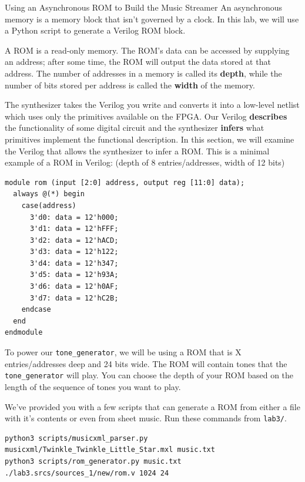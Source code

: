 \documentclass[11pt]{article}
\makeatletter
\renewcommand{\section}
{\@startsection {section}{1}{0pt}
 {-2ex}
 {1ex}
 {\bfseries\Large}}
\makeatother
\begin{document}
\section{Using an Asynchronous ROM to Build the Music Streamer}
An asynchronous memory is a memory block that isn't governed by a clock.
In this lab, we will use a Python script to generate a Verilog ROM block.

A ROM is a read-only memory.
The ROM's data can be accessed by supplying an address; after some time, the ROM will output the data stored at that address.
The number of addresses in a memory is called its \textbf{depth}, while the number of bits stored per address is called the \textbf{width} of the memory.

The synthesizer takes the Verilog you write and converts it into a low-level netlist which uses only the primitives available on the FPGA.
Our Verilog \textbf{describes} the functionality of some digital circuit and the synthesizer \textbf{infers} what primitives implement the functional description.
In this section, we will examine the Verilog that allows the synthesizer to infer a ROM.
This is a minimal example of a ROM in Verilog: (depth of 8 entries/addresses, width of 12 bits)

\begin{verbatim}
module rom (input [2:0] address, output reg [11:0] data);
  always @(*) begin
    case(address)
      3'd0: data = 12'h000;
      3'd1: data = 12'hFFF;
      3'd2: data = 12'hACD;
      3'd3: data = 12'h122;
      3'd4: data = 12'h347;
      3'd5: data = 12'h93A;
      3'd6: data = 12'h0AF;
      3'd7: data = 12'hC2B;
    endcase
  end
endmodule
\end{verbatim}

To power our \verb|tone_generator|, we will be using a ROM that is X entries/addresses deep and 24 bits wide.
The ROM will contain tones that the \verb|tone_generator| will play.
You can choose the depth of your ROM based on the length of the sequence of tones you want to play.

We've provided you with a few scripts that can generate a ROM from either a file with it's contents or even from sheet music.
Run these commands from \verb|lab3/|.

\begin{verbatim}
python3 scripts/musicxml_parser.py musicxml/Twinkle_Twinkle_Little_Star.mxl music.txt
python3 scripts/rom_generator.py music.txt ./lab3.srcs/sources_1/new/rom.v 1024 24
\end{verbatim}
\end{document}

